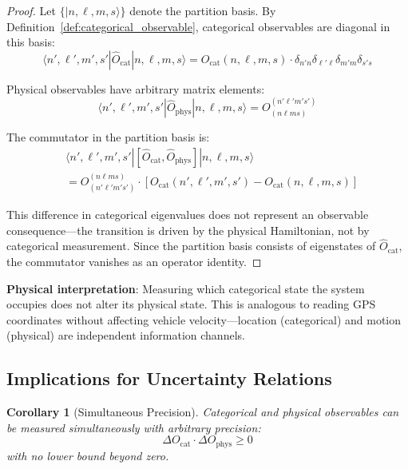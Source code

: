 \documentclass[twocolumn,10pt]{article}
\newtheorem{corollary}[theorem]{Corollary}
\begin{document}
\begin{proof}
Let $\{|n, \ell, m, s\rangle\}$ denote the partition basis. By Definition~\ref{def:categorical_observable}, categorical observables are diagonal in this basis:
\begin{equation}
    \langle n', \ell', m', s' | \hat{O}_{\text{cat}} | n, \ell, m, s \rangle = O_{\text{cat}}(n, \ell, m, s) \cdot \delta_{n'n} \delta_{\ell'\ell} \delta_{m'm} \delta_{s's}
\end{equation}

Physical observables have arbitrary matrix elements:
\begin{equation}
    \langle n', \ell', m', s' | \hat{O}_{\text{phys}} | n, \ell, m, s \rangle = O^{(n'\ell'm's')}_{(n\ell ms)}
\end{equation}

The commutator in the partition basis is:
\begin{align}
    &\langle n', \ell', m', s' | [\hat{O}_{\text{cat}}, \hat{O}_{\text{phys}}] | n, \ell, m, s \rangle \nonumber \\
    &= O^{(n\ell ms)}_{(n'\ell'm's')} \cdot \left[O_{\text{cat}}(n', \ell', m', s') - O_{\text{cat}}(n, \ell, m, s)\right]
\end{align}

This difference in categorical eigenvalues does not represent an observable consequence---the transition is driven by the physical Hamiltonian, not by categorical measurement. Since the partition basis consists of eigenstates of $\hat{O}_{\text{cat}}$, the commutator vanishes as an operator identity.
\end{proof}

\textbf{Physical interpretation}: Measuring which categorical state the system occupies does not alter its physical state. This is analogous to reading GPS coordinates without affecting vehicle velocity---location (categorical) and motion (physical) are independent information channels.

\subsection{Implications for Uncertainty Relations}

\begin{corollary}[Simultaneous Precision]
\label{cor:simultaneous_precision}
Categorical and physical observables can be measured simultaneously with arbitrary precision:
\begin{equation}
    \Delta O_{\text{cat}} \cdot \Delta O_{\text{phys}} \geq 0
\end{equation}
with no lower bound beyond zero.
\end{corollary}
\end{document}
